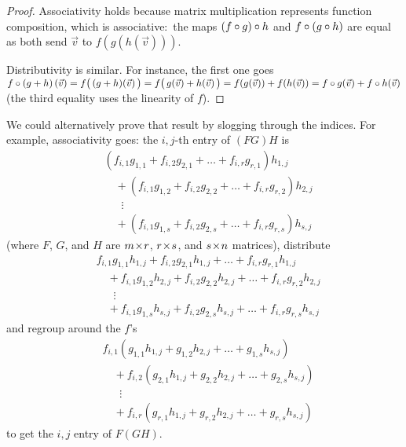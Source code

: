 \begin{proof}
Associativity holds because matrix multiplication represents function
composition, which is associative:~the maps
\( (f\mathbin\circ g)\mathbin\circ h \) and 
\( f\mathbin\circ (g\mathbin\circ h) \) are equal 
as both send \( \vec{v} \) to \( f(g(h(\vec{v}))) \).

Distributivity  is similar.
For instance, the first one goes
\( f\mathbin\circ (g+h)\,(\vec{v})
    =f\bigl(\,(g+h)(\vec{v})\,\bigr)  
    =f\bigl(\,g(\vec{v})+h(\vec{v})\,\bigr)
    =f(g(\vec{v}))+f(h(\vec{v}))
    =f\mathbin\circ g(\vec{v})+f\mathbin\circ h(\vec{v}) \) 
(the third equality uses the linearity of $f$).
\end{proof}

\begin{remark} 
We could alternatively prove that result by slogging through the indices.
For example, associativity goes:
the \( i,j \)-th entry of \( (FG)H \) is
\begin{align*}
   &(f_{i,1}g_{1,1}+f_{i,2}g_{2,1}+\dots+f_{i,r}g_{r,1})h_{1,j}         \\
   &\quad\text{}
        +(f_{i,1}g_{1,2}+f_{i,2}g_{2,2}+\dots+f_{i,r}g_{r,2})h_{2,j}   \\
   &\quad\;\;\vdots                                                         \\
   &\quad\text{}
        +(f_{i,1}g_{1,s}+f_{i,2}g_{2,s}+\dots+f_{i,r}g_{r,s})h_{s,j}
\end{align*}
(where \( F \), \( G \), and \( H \) are \( m \! \times \! r \),
\( r \! \times \! s \), and \( s \! \times \! n \) matrices),
distribute
\begin{align*}
   &f_{i,1}g_{1,1}h_{1,j}+f_{i,2}g_{2,1}h_{1,j}+
            \dots+f_{i,r}g_{r,1}h_{1,j}                  \\ 
   &\quad\text{}+f_{i,1}g_{1,2}h_{2,j}+f_{i,2}g_{2,2}h_{2,j}+
          \dots+f_{i,r}g_{r,2}h_{2,j}                      \\
   &\quad\;\;\vdots                                                \\
   &\quad\text{}+f_{i,1}g_{1,s}h_{s,j}+f_{i,2}g_{2,s}h_{s,j}+\dots
        +f_{i,r}g_{r,s}h_{s,j}
\end{align*}
and regroup around the \( f \)'s
\begin{align*}
   &f_{i,1}(g_{1,1}h_{1,j}+g_{1,2}h_{2,j}+\dots+g_{1,s}h_{s,j})     \\
   &\quad\text{}
        +f_{i,2}(g_{2,1}h_{1,j}+g_{2,2}h_{2,j}+\dots+g_{2,s}h_{s,j})   \\
   &\quad\;\;\vdots                                                         \\
   &\quad\text{}
         +f_{i,r}(g_{r,1}h_{1,j}+g_{r,2}h_{2,j}+\dots+g_{r,s}h_{s,j})
\end{align*}
to get the \( i,j \) entry of \( F(GH) \).


\end{remark}
